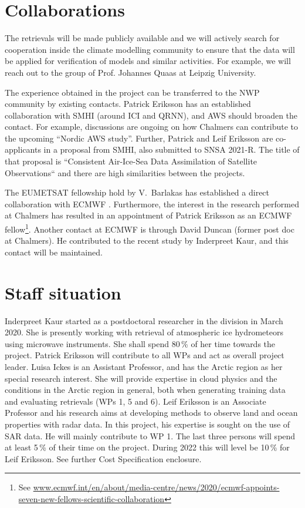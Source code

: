 \documentclass[12pt,oneside,a4paper]{article}
\begin{document}
\section{Collaborations}
%
\label{sec:collaborations}
The retrievals will be made publicly available and we will actively search
for cooperation inside the climate modelling community to ensure that the 
data will be applied for verification of models and similar activities. For example, we will reach out to the group of Prof. Johannes Quaas at Leipzig University. 


The experience obtained in the project can be transferred to the NWP community
by existing contacts. Patrick Eriksson has an established collaboration with
SMHI (around ICI and QRNN), and AWS should broaden the contact. For example,
discussions are ongoing on how Chalmers can contribute to the upcoming
``Nordic AWS study''. Further, Patrick and Leif Eriksson are co-applicants in a
proposal from SMHI, also submitted to SNSA 2021-R. The title of that proposal
is ``Consistent Air-Ice-Sea Data Assimilation of Satellite Observations`` and
there are high similarities between the projects.

The EUMETSAT fellowship hold by V.\ Barlakas has established a direct
collaboration with ECMWF \citep{barlakas:intro:21}. Furthermore, the interest
in the research performed at Chalmers has resulted in an appointment of Patrick
Eriksson  as an ECMWF fellow\footnote{See 
	\url{www.ecmwf.int/en/about/media-centre/news/2020/ecmwf-appoints-seven-new-fellows-scientific-collaboration}}.
Another contact at ECMWF is through David Duncan (former post doc at Chalmers).
He contributed to the recent study by Inderpreet Kaur, and this contact will be
maintained.
\section{Staff situation}
%
\label{sec:staff}
Inderpreet Kaur started as a postdoctoral researcher in the division in March
2020. She is presently working with retrieval of atmospheric ice hydrometeors
using microwave instruments. She shall spend 80\,\% of her time towards the
project. Patrick Eriksson will contribute to all WPs and act as overall project
leader. Luisa Ickes is an Assistant Professor, and has the Arctic region as her
special research interest. She will provide expertise in cloud physics and the
conditions in the Arctic region in general, both when generating training data
and evaluating retrievals (WPs 1, 5 and 6). Leif Eriksson is an Associate
Professor and his research aims at developing methods to observe land and ocean
properties with radar data. In this project, his expertise is sought on the use
of SAR data. He will mainly contribute to WP 1. The
last three persons will spend at least 5\,\% of their time on the project.
During 2022 this will level be 10\,\% for Leif Eriksson. See further Cost
Specification enclosure.
\end{document}
